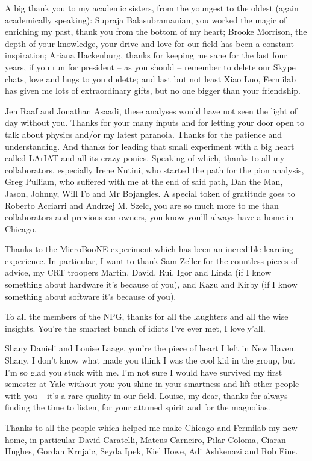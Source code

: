 \documentclass[letterpaper,12pt]{yalephd}
\begin{document}
A big thank you to my academic sisters, from the youngest to the oldest (again academically speaking): Supraja Balasubramanian, you worked the magic of enriching my past, thank you from the bottom of my heart;  Brooke Morrison, the depth of your knowledge, your drive and love for our field has been a constant inspiration;  Ariana  Hackenburg, thanks for keeping me sane for the last four years, if you run for president -- as you should -- remember to delete our Skype chats, love and hugs to you dudette; and last but not least Xiao Luo, Fermilab has given me lots of extraordinary gifts, but no one  bigger than your friendship. 

Jen Raaf and Jonathan Asaadi, these analyses would have not seen the light of day without you. Thanks for your many inputs and for letting your door open to talk about physics and/or my latest paranoia. Thanks for the patience and understanding. And thanks for leading that small experiment with a big heart called LArIAT and all its crazy ponies. Speaking of which, thanks to all my collaborators, especially Irene Nutini, who started the path for the pion analysis, Greg Pulliam, who suffered with me at the end of said path, Dan the Man, Jason, Johnny, Will Fo and Mr Bojangles. A special token of gratitude goes to Roberto Acciarri and Andrzej M. Szelc, you are so much more to me than collaborators and previous car owners, you know you'll always have a home in Chicago.

Thanks to the MicroBooNE experiment which has been an incredible learning experience. In particular, I want to thank  Sam Zeller for the countless pieces of advice,  my CRT troopers Martin, David, Rui, Igor and Linda  (if I know something about hardware it's because of you), and Kazu and  Kirby (if I know something about software it's because of you).

To all the members of the NPG, thanks for all the laughters and all the wise insights. You're the smartest bunch of idiots I've ever met, I love y'all.

Shany Danieli and Louise Laage, you're the piece of heart I left in New Haven. Shany, I don't know what made you think I was the cool kid in the group, but I'm so glad you stuck with me. I'm not sure I would have survived my first semester at Yale without you: you shine in your smartness and lift other people with you -- it's a rare quality in our field. Louise, my dear, thanks for always finding the time to listen, for your attuned spirit and for the magnolias.

Thanks to all the people which helped me make Chicago and Fermilab my new home, in particular David Caratelli,  Mateus Carneiro, Pilar Coloma, Ciaran Hughes, Gordan Krnjaic, Seyda Ipek, Kiel Howe, Adi Ashkenazi and Rob Fine.
\end{document}
